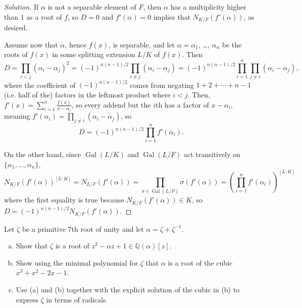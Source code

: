 \documentclass[10pt]{article}
\providecommand{\Gal}{\operatorname{Gal}}
\providecommand{\QQ}{\mathbb Q}
\providecommand{\ii}{\item}
\providecommand{\inv}{^{-1}}
\newenvironment{soln}{\begin{proof}[Solution]}{\end{proof}}
\begin{document}
\begin{soln}
    If $\alpha$ is not a separable element of $F$,
    then $\alpha$ has a multiplicity higher than $1$
    as a root of $f$, so $D = 0$ and $f'(\alpha) = 0$
    implies that $N_{K/F}(f'(\alpha))$, as desired.

    Assume now that $\alpha$, hence $f(x)$, is separable, and
    let $\alpha = \alpha_1$, \dots, $\alpha_n$ be the roots of $f(x)$
    in some splitting extension $L/K$ of $f(x)$. Then
    \begin{equation*}
	D = \prod_{i < j} (\alpha_i - \alpha_j)^2
	= (-1)^{n(n-1)/2}
	\prod_{i\ne j} (\alpha_i - \alpha_j)
	= (-1)^{n(n-1)/2}
	\prod_{i=1}^n \prod_{j\ne i} (\alpha_i - \alpha_j),
    \end{equation*}
    where the coefficient of $(-1)^{n(n-1)/2}$
    comes from negating $1 + 2 + \cdots + n-1$
    (i.e. half of the) factors in the leftmost product where $i < j$.
    Then, $f'(x) = \sum_{i=1}^n \frac{f(x)}{x - \alpha_i}$,
    so every addend but the $i$th has a factor of $x-\alpha_i$,
    meaning $f'(\alpha_i) = \prod_{j\ne i}(\alpha_i - \alpha_j)$, so
    \begin{equation*}
	D = (-1)^{n(n-1)/2}\prod_{i=1}^n f'(\alpha_i).
    \end{equation*}

    On the other hand, since $\Gal(L/K)$
    and $\Gal(L/F)$ act transitively on $\{\alpha_1,\dots,\alpha_n\}$,
    \begin{equation*}
	N_{K/F}(f'(\alpha))^{[L:K]} = N_{L/F}(f'(\alpha))
	= \prod_{\sigma\in\Gal(L/F)} \sigma(f'(\alpha))
	= \left(\prod_{i=1}^n f'(\alpha_i)\right)^{[L:K]}
    \end{equation*}
    where the first equality is true because
    $N_{K/F}(f'(\alpha))\in K$,
    so $D = (-1)^{n(n-1)/2} N_{K/F}(f'(\alpha))$.
\end{soln}

\begin{problem}
    [\S14.7\#2]
    Let $\zeta$ be a primitive $7$th root of unity
    and let $\alpha = \zeta + \zeta\inv$.
    \begin{enumerate}[(a)]
	\ii Show that $\zeta$ is a root of
	$z^2 - \alpha z + 1\in \QQ(\alpha)[z]$.
	\ii Show using the minimal polynomial for $\zeta$ that
	$\alpha$ is a root of the cubic
	$x^3 + x^2 - 2x - 1$.
	\ii Use (a) and (b) together with
	the explicit solution of the cubic in (b)
	to express $\zeta$ in terms of radicals.
    \end{enumerate}
\end{problem}
\end{document}

